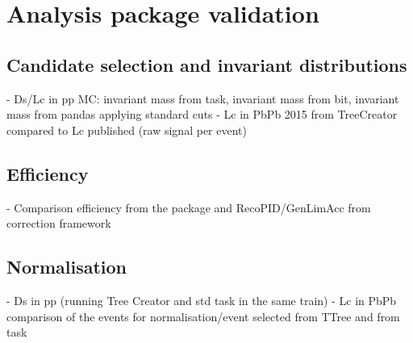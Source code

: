 \section{Analysis package validation}
\label{sec:validation}

\subsection{Candidate selection and invariant distributions}
\label{subsec:invMassValidation}

- Ds/Lc in pp MC: invariant mass from task, invariant mass from bit, invariant mass from pandas applying standard cuts
- Lc in PbPb 2015 from TreeCreator compared to Lc published (raw signal per event)

\subsection{Efficiency}
\label{subsec:effValidation}

- Comparison efficiency from the package and RecoPID/GenLimAcc from correction framework

\subsection{Normalisation}
\label{subsec:normValidation}

- Ds in pp (running Tree Creator and std task in the same train)
- Lc in PbPb comparison of the events for normalisation/event selected from TTree and from task
